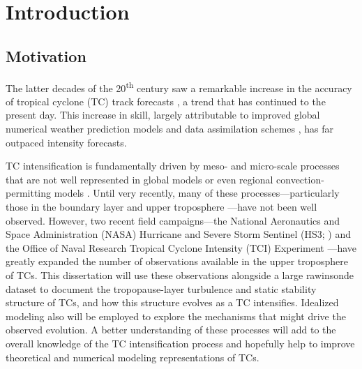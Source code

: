 \chapter{Introduction}
\label{intro}

\section{Motivation}

\indent The latter decades of the 20\textsuperscript{th} century saw a remarkable increase in the accuracy of tropical cyclone (TC) track forecasts \citep{PowellAberson2001}, a trend that has continued to the present day.
This increase in skill, largely attributable to improved global numerical weather prediction models and data assimilation schemes \citep{Galletal2013}, has far outpaced intensity forecasts.

TC intensification is fundamentally driven by meso- and micro-scale processes that are not well represented in global models or even regional convection-permitting models \citep{Rogersetal2006}.
Until very recently, many of these processes---particularly those in the boundary layer \citep{Blacketal2007} and upper troposphere \citep{DoyleTCI}---have not been well observed.
However, two recent field campaigns---the National Aeronautics and Space Administration (NASA) Hurricane and Severe Storm Sentinel (HS3; \citeauthor{Braunetal2016} \citeyear{Braunetal2016}) and the Office of Naval Research Tropical Cyclone Intensity (TCI) Experiment \citep{DoyleTCI}---have greatly expanded the number of observations available in the upper troposphere of TCs.
This dissertation will use these observations alongside a large rawinsonde dataset to document the tropopause-layer turbulence and static stability structure of TCs, and how this structure evolves as a TC intensifies.
Idealized modeling also will be employed to explore the mechanisms that might drive the observed evolution.
A better understanding of these processes will add to the overall knowledge of the TC intensification process and hopefully help to improve theoretical and numerical modeling representations of TCs.

